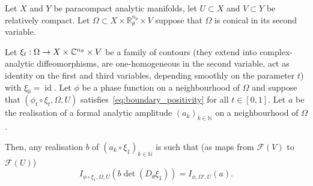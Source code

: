 \documentclass[AHL,Unicode,longabstracts,published]{cedram}
\DeclareMathOperator{\idd}{id}
\newcommand{\clF}{\mathcal{F}}
\newcommand\1{\mathds{1}}
\newcommand{\R}{\mathbb{R}}
\newcommand{\C}{\mathbb{C}}
\newcommand{\N}{\mathbb{N}}
\renewcommand*{\to}{\mathchoice{\longrightarrow}{\rightarrow}{\rightarrow}{\rightarrow}}
\begin{document}
\begin{prop}\label{prop:change_phase_variables}
Let $X$ and $Y$ be
paracompact analytic manifolds, let $U\subset X$ and $V\subset Y$ be relatively compact. Let $\Omega\subset X\times \R^{n_{\theta}}_{\theta}\times V$ suppose that $\Omega$ is conical in its second variable.

Let $\xi_t:\Omega\to X\times \C^{n_{\theta}}\times V$ be a family of contours (they extend into complex-analytic diffeomorphisms, are one-homogeneous in the second variable, act as identity on the first and third variables, depending smoothly on the parameter $t$) with $\xi_0=\idd$. Let $\phi$ be a phase function on a neighbourhood of $\Omega$ and suppose that $(\phi_t\circ
\xi_t,\Omega,U)$ satisfies~\eqref{eq:boundary_positivity} for all $t\in [0,1]$. Let $a$ be the realisation of a formal analytic amplitude $(a_k)_{k\in \N}$ on a neighbourhood of $\Omega$.

Then, any realisation $b$ of $(a_k\circ \xi_1)_{k\in \N}$ is such that (as maps from $\clF(V)$ to $\clF(U)$)
\[
I_{\phi\circ \xi_1,\Omega,U}(b\det(D_{\theta}\xi_1))=I_{\phi,\Omega',U}(a).
\]
\end{prop}
\end{document}
